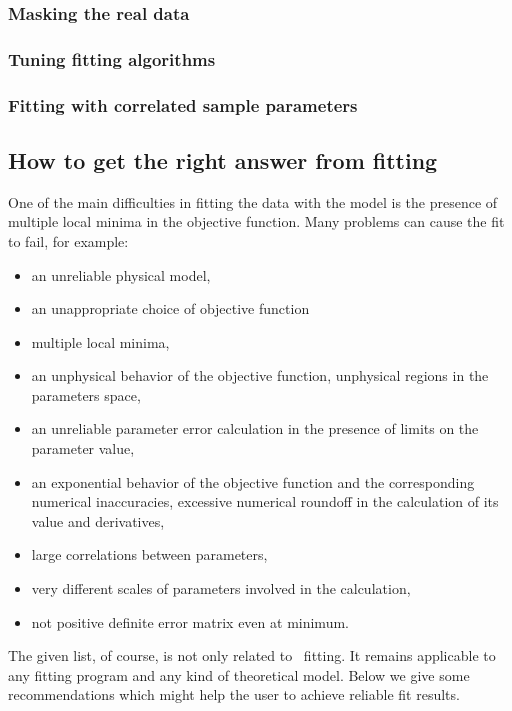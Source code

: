 \subsubsection{Masking the real data}
\subsubsection{Tuning fitting algorithms}
\subsubsection{Fitting with correlated sample parameters}


\subsection {How to get the right answer from fitting}

One of the main difficulties in fitting the data with the model 
is the presence of multiple
local minima in the objective function. Many problems can cause the
fit to fail, for example:
\begin{itemize}
\item an unreliable physical model,
\item an unappropriate choice of objective function
\item multiple local minima,
\item an unphysical behavior of the objective function, unphysical regions
  in the parameters space,
\item an unreliable parameter error calculation in the presence of
  limits on the parameter value,
\item an exponential behavior of the objective function and the
  corresponding numerical inaccuracies, excessive numerical roundoff
  in the calculation of its value and derivatives,
\item large correlations between parameters,
\item very different scales of parameters involved in the calculation,
\item not positive definite error matrix even at minimum.
\end{itemize}


The given list, of course, is not only related to \BornAgain\
fitting. It remains applicable to any fitting program and any kind of theoretical model.
 Below we give some recommendations which might help the user to achieve reliable fit results.

